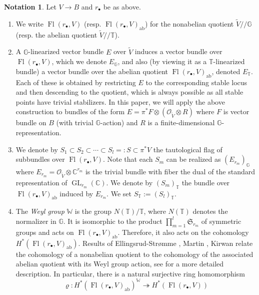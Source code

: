 \documentclass[a4paper,12pt]{amsart}
\numberwithin{equation}{section}
\theoremstyle{definition}
\newtheorem{notation}[theorem]{Notation}
\newcommand{\C}{\mathbb{C}}
\newcommand{\G}{\mathbb{G}}
\newcommand{\T}{\mathbb{T}}
\newcommand{\W}{\mathbb{W}}
\newcommand{\Fl}{\operatorname{Fl}}
\newcommand{\GL}{\operatorname{GL}}
\begin{document}
\begin{notation}\label{notation:flag_bundle}
    Let $V\to B$ and $r_\bullet$ be as above.
    \begin{enumerate}
        \item 
        We write $\Fl(r_\bullet,V)$ (resp. $\Fl(r_\bullet,V)_{\operatorname{ab}}$) for the nonabelian quotient $\widetilde{V}/\!/\G$ (resp. the abelian quotient $\widetilde{V}/\!/\T$).
        \item 
        A $\G$-linearized vector bundle $E$ over $\widetilde{V}$ induces a vector bundle over $\Fl(r_\bullet,V)$, which we denote $E_\G$, and also (by viewing it as a $\T$-linearized bundle) a vector bundle over the abelian quotient $\Fl(r_\bullet,V)_{\operatorname{ab}}$, denoted $E_\T$. Each of these is obtained by restricting $E$ to the corresponding stable locus and then descending to the quotient, which is always possible as all stable points have trivial stabilizers. In this paper, we will apply the above construction to bundles of the form $E=\pi^*F\otimes (\mathcal{O}_{\widetilde{V}}\otimes R)$ where $F$ is vector bundle on $B$ (with trivial $\G$-action) and $R$ is a finite-dimensional $\G$-representation.
        \item 
        We denote by $S_1\subset S_2\subset\cdots\subset S_l=:S\subset\pi^*V$ the tautological flag of subbundles over $\Fl(r_\bullet,V)$.
        Note that each $S_m$ can be realized as $(E_{r_m})_\G$ where $E_{r_m}=\mathcal{O}_{\widetilde{V}}\otimes\C^{r_m}$ is the trivial bundle with fiber the dual of the standard representation of $\GL_{r_m}(\C)$.
        We denote by $(S_m)_\T$ the bundle over $\Fl(r_\bullet,V)_{\operatorname{ab}}$ induced by $E_{r_m}$.
        We set $S_\T:=(S_l)_\T$. 
        \item 
        The \emph{Weyl group} $\W$ is the group $N(\T)/\T$, where $N(\T)$ denotes the normalizer in $\G$.
        It is isomorphic to the product $\prod_{m=1}^l\mathfrak{S}_{r_m}$ of symmetric groups and acts on $\Fl(r_\bullet,V)_{\operatorname{ab}}$. Therefore, it also acts on the cohomology $H^*(\Fl(r_\bullet,V)_{\operatorname{ab}})$. Results of Ellingsrud-Str\o mme \cite{ES}, Martin \cite{Martin}, Kirwan \cite{Kirwan} relate the cohomology of a nonabelian quotient to the cohomology of the associated abelian quotient with its Weyl group action, see \cite[Section 3.1]{CFKS} for a more detailed description. In particular, there is a natural surjective ring homomorphism
        \begin{equation}\label{equation:cohomology_surjection}
        \varrho : H^*(\Fl(r_\bullet,V)_{\operatorname{ab}})^\W\twoheadrightarrow H^*(\Fl(r_\bullet,V))

\end{equation}
\end{enumerate}
\end{notation}
\end{document}
